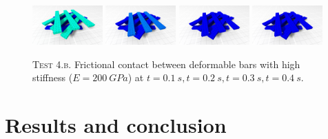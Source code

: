 \documentclass[final,3p]{elsarticle}
\begin{document}
\begin{figure}[!tbp]
  \centering
	\includegraphics[width=0.24\textwidth]{pics/ribbons_2_20.png}
  \includegraphics[width=0.24\textwidth]{pics/ribbons_2_40.png}
	\includegraphics[width=0.24\textwidth]{pics/ribbons_2_60.png}
	\includegraphics[width=0.24\textwidth]{pics/ribbons_2_80.png}
	\hfill
  \caption{\textsc{Test 4.b}. Frictional contact between deformable bars with high stiffness ($E=\SI{200}{GPa}$) at $t=\SI{0.1}{s},t=\SI{0.2}{s},t=\SI{0.3}{s},t=\SI{0.4}{s}$.}
	\label{fig:ribbons_2}
\end{figure}



%




\section{Results and conclusion}
\end{document}
